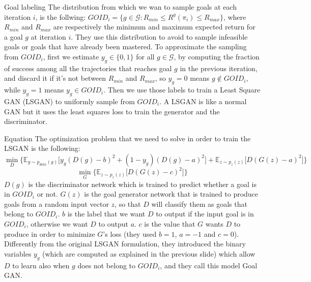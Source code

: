 \documentclass{beamer}
\begin{document}
	\begin{frame}{Goal labeling }
		The distribution from which we wan to sample goals at each iteration $i$, is the follwing: $GOID_i = \{ g \in \mathcal{G} \colon R_{min} \le R^g(\pi_i) \le R_{max}\}$, where $R_{min}$ and $R_{max}$ are respectively the minimum and maximum expected return for a goal $g$ at iteration $i$. They use this distribution to avoid to sample infeasible goals or goals that have already been mastered. To approximate the sampling from $GOID_i$, first we estimate $y_g\in \{0,1\}$ for all $g \in \mathcal{G}$, by computing the fraction of success among all the trajectories that reaches goal $g$ in the previous iteration, and discard it if it's not between $R_{min}$ and $R_{max}$, so $y_g = 0$ means $g \not\in GOID_i$, while $y_g = 1$ means $y_g \in GOID_i$. Then we use those labels to train a Least Square GAN (LSGAN) to uniformly sample from $GOID_i$. A LSGAN is like a normal GAN but it uses the least squares loss to train the generator and the discriminator.
	\end{frame}
	
	\begin{frame}{Equation}
		\footnotesize
		The optimization problem that we need to solve in order to train the LSGAN is the following:
		\scriptsize
		\begin{equation}
			\label{eq:1}
			\min_{D} \Big\{\mathbb{E}_{g \sim p_{data}(g)} \Big[y_g(D(g)-b)^2 + (1-y_g)(D(g)-a)^2\Big] + \mathbb{E}_{z \sim p_z(z)} \Big[D(G(z)-a)^2\Big] \Big\}
		\end{equation}
		\begin{equation}
			\label{eq:2}
			\min_G\Big\{ \mathbb{E}_{z \sim p_z(z)} \Big[D(G(z)-c)^2\Big] \Big\}
		\end{equation}
		\footnotesize
		 $D(g)$ is the discriminator network which is trained to predict whether a goal is in $GOID_i$ or not. $G(z)$ is the goal generator network that is trained to produce goals from a random input vector $z$, so that $D$ will classify them as goals that belong to $GOID_i$. $b$ is the label that we want $D$ to output if the input goal is in $GOID_i$, otherwise we want $D$ to output $a$. $c$ is the value that $G$ wants $D$ to produce in order to minimize $G$'s loss (they used $b=1$, $a=-1$ and $c=0$). Differently from the original LSGAN formulation, they introduced the binary variables $y_g$ (which are computed as explained in the previous slide) which allow $D$ to learn also when $g$ does not belong to $GOID_i$, and they call this model Goal GAN.
	\end{frame}
\end{document}
